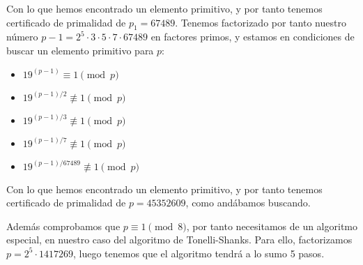 \documentclass[fleqn]{article}
\begin{document}
    Con lo que hemos encontrado un elemento primitivo, y por tanto tenemos certificado de primalidad de $p_1 = 67489$.
    Tenemos factorizado por tanto nuestro número $p-1 = 2^5 \cdot 3 \cdot 5 \cdot 7 \cdot 67489$ en factores primos, y estamos en condiciones de buscar un elemento 
    primitivo para $p$:

    \begin{itemize}
        \item $19^{(p - 1)} \equiv 1 \pmod{p}$
        \item $19^{(p - 1)/2} \not\equiv 1 \pmod{p}$    
        \item $19^{(p - 1)/3} \not\equiv 1 \pmod{p}$
        \item $19^{(p - 1)/7} \not\equiv 1 \pmod{p}$
        \item $19^{(p - 1)/67489} \not\equiv 1 \pmod{p}$
    \end{itemize}

    Con lo que hemos encontrado un elemento primitivo, y por tanto tenemos certificado de primalidad de $p = 45352609$, como andábamos buscando.
    
    Además comprobamos que $p \equiv 1 \pmod{8}$, por tanto necesitamos de un algoritmo especial, en nuestro caso del algoritmo de Tonelli-Shanks.
    Para ello, factorizamos $p = 2^5 \cdot 1417269$, luego tenemos que el algoritmo tendrá a lo sumo 5 pasos.
\end{document}
